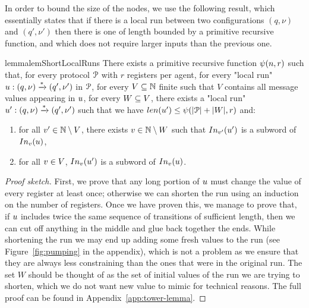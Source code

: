 In order to bound the size of the nodes, we use the following result, which essentially states that if there is a local run between two configurations $(q, \nu)$ and $(q', \nu')$ then there is one of length bounded by a primitive recursive function, and which does not require larger inputs than the previous one.

\begin{restatable}{lemma}{lemShortLocalRuns}
	\label{lem:short-local-runs}
	There exists a primitive recursive function $\psi(n,r)$ such that, for every protocol $\mathcal{P}$ with $r$ registers per agent, for every "local run" $u: (q, \nu) \xrightarrow{*} (q', \nu')$ in $\mathcal{P}$, for every $V \subseteq \mathbb{N}$ finite such that $V$ contains all message values appearing in $u$,  for every $W \subseteq V$, there exists a "local run" $u': (q, \nu) \xrightarrow{*} (q', \nu')$ such that we have $\length{\localrun'} \leq \towerfun(\size{\prot} + \size{\Vinit},r)$ and:
	\begin{enumerate}
		\item \label{item:shorterrun_anyvalue} for all $v' \in \mathbb{N} \setminus V$, there exists $v \in \mathbb{N} \setminus W$ such that $\vinput{\aval'}{\localrun'}$ is a subword of $\vinput{\aval}{\localrun}$,
		\item \label{item:shorterrun_oldvalues} for all $v \in V$, $\vinput{\aval}{\localrun'}$ is a subword of $\vinput{\aval}{\localrun}$. 
	\end{enumerate}
\end{restatable}

\begin{proof}[Proof sketch]
	First, we prove that any long portion of $u$ must change the value of every register at least once; otherwise we can shorten the run using an induction on the number of registers. Once we have proven this, we manage to prove that, if $u$ includes twice the same sequence of transitions of sufficient length, then we can cut off anything in the middle and glue back together the ends. While shortening the run we may end up adding some fresh values to the run (see Figure~\ref{fig:pumping} in the appendix), which is not a problem as we ensure that they are always less constraining than the ones that were in the original run. The set $W$ should be thought of as the set of initial values of the run we are trying to shorten, which we do not want new value to mimic for technical reasons.
	The full proof can be found in Appendix~\ref{app:tower-lemma}.
\end{proof}




